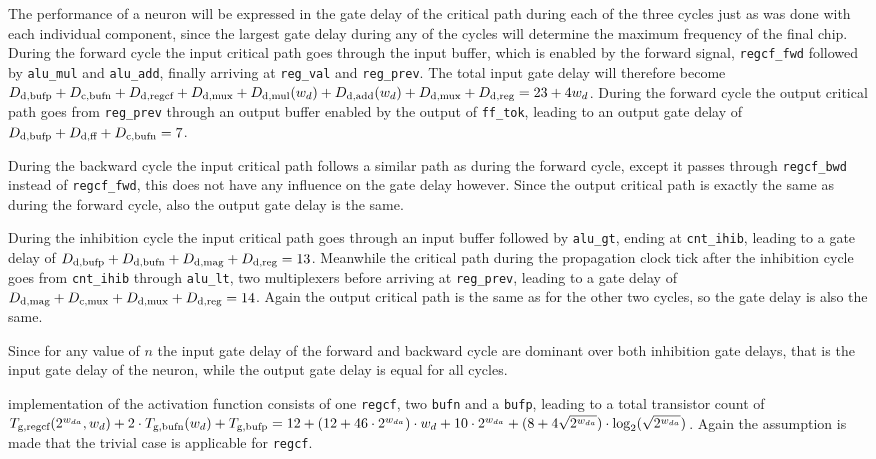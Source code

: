 The performance of a neuron will be expressed in the gate delay of the critical path during each of the three cycles just as was done with each individual component, since the largest gate delay during any of the cycles will determine the maximum frequency of the final chip. During the forward cycle the input critical path goes through the input buffer, which is enabled by the forward signal, \texttt{regcf\_fwd} followed by \texttt{alu\_mul} and \texttt{alu\_add}, finally arriving at \texttt{reg\_val} and \texttt{reg\_prev}. The total input gate delay will therefore become $\f{D}{d}{bufp} + \f{D}{c}{bufn} + \f{D}{d}{regcf} + \f{D}{d}{mux} + \f{D}{d}{mul}(w_{d}) + \f{D}{d}{add}(w_{d}) + \f{D}{d}{mux} + \f{D}{d}{reg} = 23 + 4w_{d}$. During the forward cycle the output critical path goes from \texttt{reg\_prev} through an output buffer enabled by the output of \texttt{ff\_tok}, leading to an output gate delay of $\f{D}{d}{bufp} + \f{D}{d}{ff} + \f{D}{c}{bufn} = 7$.

During the backward cycle the input critical path follows a similar path as during the forward cycle, except it passes through \texttt{regcf\_bwd} instead of \texttt{regcf\_fwd}, this does not have any influence on the gate delay however. Since the output critical path is exactly the same as during the forward cycle, also the output gate delay is the same.

During the inhibition cycle the input critical path goes through an input buffer followed by \texttt{alu\_gt}, ending at \texttt{cnt\_ihib}, leading to a gate delay of $\f{D}{d}{bufp} + \f{D}{d}{bufn} + \f{D}{d}{mag} + \f{D}{d}{reg} = 13$. Meanwhile the critical path during the propagation clock tick after the inhibition cycle goes from \texttt{cnt\_ihib} through \texttt{alu\_lt}, two multiplexers before arriving at \texttt{reg\_prev}, leading to a gate delay of $\f{D}{d}{mag} + \f{D}{c}{mux} + \f{D}{d}{mux} + \f{D}{d}{reg} = 14$. Again the output critical path is the same as for the other two cycles, so the gate delay is also the same.

Since for any value of $n$ the input gate delay of the forward and backward cycle are dominant over both inhibition gate delays, that is the input gate delay of the neuron, while the output gate delay is equal for all cycles.

 implementation of the activation function consists of one \texttt{regcf}, two \texttt{bufn} and a \texttt{bufp}, leading to a total transistor count of $\f{T}{g}{regcf}(2^{w_{da}}, w_{d}) + 2 \cdot \f{T}{g}{bufn}(w_{d}) + \f{T}{g}{bufp} = 12 + (12 + 46 \cdot 2^{w_{da}}) \cdot w_{d} + 10 \cdot 2^{w_{da}} + (8 + 4\sqrt{2^{w_{da}}}) \cdot \log_{2}(\sqrt{2^{w_{da}}})$. Again the assumption is made that the trivial case is applicable for \texttt{regcf}.

